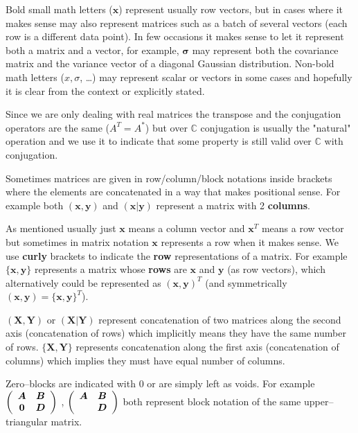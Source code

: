 \documentclass[11pt, a4paper]{report}
\theoremstyle{plain}
\theoremstyle{definition}
\theoremstyle{remark}
\newcommand{\C}{\mathbb{C}}
\newcommand{\X}{\mathbf{X}}
\newcommand{\x}{\mathbf{x}}
\newcommand{\Y}{\mathbf{Y}}
\newcommand{\y}{\mathbf{y}}
\newcommand{\bv}[1]{\boldsymbol{#1}}
\begin{document}
Bold small math letters ($\bv{x}$) represent usually row vectors, but in cases
where it makes sense may also represent matrices such as a batch of several
vectors (each row is a different data point). In few occasions it makes sense to
let it represent both a matrix and a vector, for example, $\bv{\sigma}$ may
represent both the covariance matrix and the variance vector of a diagonal
Gaussian distribution. Non-bold math letters ($x, \sigma$, \dots) may represent
scalar or vectors in some cases and hopefully it is clear from the context or
explicitly stated.

Since we are only dealing with real matrices the transpose and the conjugation
operators are the same ($A^T = A^*$) but over $\C$ conjugation is usually the
"natural" operation and we use it to indicate that some property is still valid
over $\C$ with conjugation.

Sometimes matrices are given in row/column/block notations inside brackets where
the elements are concatenated in a way that makes positional sense. For example
both $(\x,\y)$ and $(\x | \y)$ represent a matrix with 2 \textbf{columns}.

As mentioned usually just $\x$ means a column vector and $\x^T$ means a row
vector but sometimes in matrix notation $\x$ represents a row when it makes
sense. We use \textbf{curly} brackets to indicate the \textbf{row}
representations of a matrix. For example $\{\x, \y\}$ represents a matrix whose
\textbf{rows} are $\x$ and $\y$ (as row vectors), which alternatively could be
represented as $(\x, \y)^T$ (and symmetrically $(\x,\y) = \{\x,\y\}^T$).

$(\X,\Y)$ or $(\X | \Y)$ represent concatenation of two matrices along the
second axis (concatenation of rows) which implicitly means they have the same
number of rows. $\{\X, \Y\}$ represents concatenation along the first axis
(concatenation of columns) which implies they must have equal number of columns.

Zero--blocks are indicated with $0$ or are simply left as voids. For
example
$ \left( \begin{array}{c c} \bv{A} & \bv{B} \\ \bv{0} & \bv{D}
\end{array} \right) $ 
,
$ \left( \begin{array}{c c} \bv{A} & \bv{B} \\  & \bv{D}
\end{array} \right) $ 
both represent block notation of the same upper--triangular matrix.
\end{document}
